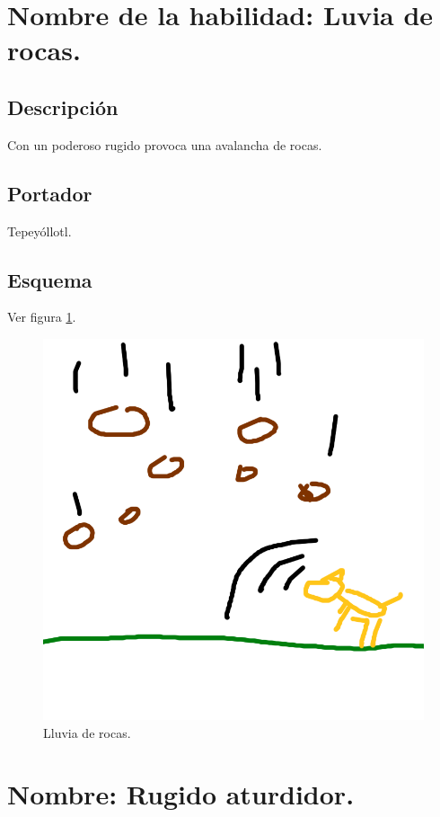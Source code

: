 \section{Nombre de la habilidad: Luvia de rocas.} \label{hab.LLuviaRocas}
\subsection{Descripción}
Con un poderoso rugido provoca una avalancha de rocas. 
\subsection{Portador}
Tepeyóllotl.
\subsection{Esquema}
			Ver figura \ref{fig:lluviaR}.
			\begin{figure}
				\centering
				\includegraphics[height=0.2 \textheight]{Imagenes/lluviaR}
				\caption{Lluvia de rocas.}
				\label{fig:lluviaR}
			\end{figure}
			
\section{Nombre: Rugido aturdidor.}\label{hab.RugAtur}
